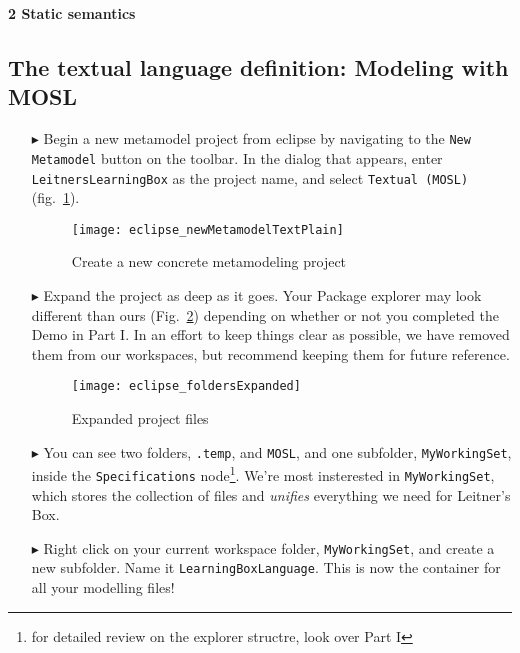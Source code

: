 \newpage
\texHeader

{\bf \Large 2 \hspace{0.5cm}Static semantics}

\subsection{The textual language definition: Modeling with MOSL}
\label{sec:staticConcrete}

\begin{itemize}

\item[$\blacktriangleright$] \hypertarget{static tex}{Begin a} new metamodel project from eclipse by navigating to the \texttt{New Metamodel} button on the
toolbar. In the dialog that appears, enter \texttt{LeitnersLearningBox} as the project name, and select \texttt{Textual (MOSL)}  (fig.~\ref{fig:new_project}).

\begin{figure}[htbp]
	\centering
  \texttt{[image: eclipse\_newMetamodelTextPlain]}
	\caption{Create a new concrete metamodeling project}
	\label{fig:new_project}
\end{figure}

\item[$\blacktriangleright$] Expand the project as deep as it goes. Your Package explorer may look different than ours (Fig.~\ref{fig:expanded_folders})
depending on whether or not you completed the Demo in Part I. In an effort to keep things clear as possible, we have removed them from our workspaces, but
recommend keeping them for future reference.

\begin{figure}[htbp]
	\centering
  \texttt{[image: eclipse\_foldersExpanded]}
	\caption{Expanded project files}
	\label{fig:expanded_folders}
\end{figure} 

\item[$\blacktriangleright$] You can see two folders, \texttt{.temp}, and \texttt{MOSL}, and one subfolder, \texttt{MyWorkingSet}, inside the
\texttt{Specifications} node\footnote{for detailed review on the explorer structre, look over Part I}. We're most insterested in \texttt{MyWorkingSet}, which
stores the collection of files and  \emph{unifies} everything we need for Leitner's Box.

\item[$\blacktriangleright$] Right click on your current workspace folder, \texttt{MyWorkingSet}, and create a new subfolder. Name it
\texttt{LearningBoxLanguage}. This is now the container for all your modelling files!



\end{itemize}
